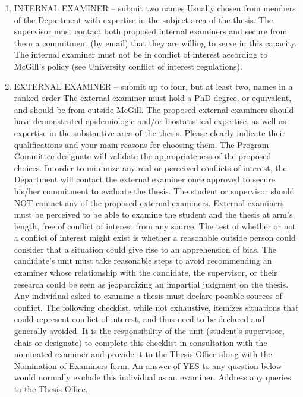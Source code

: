 \documentclass[
]{book}
\begin{document}
\begin{enumerate}
\def\labelenumi{\arabic{enumi}.}
\item
  INTERNAL EXAMINER -- submit two names
  Usually chosen from members of the Department with expertise in the subject area of the thesis. The supervisor must contact both proposed internal examiners and secure from them a commitment (by email) that they are willing to serve in this capacity. The internal examiner must not be in conflict of interest according to McGill's policy (see University conflict of interest regulations).
\item
  EXTERNAL EXAMINER -- submit up to four, but at least two, names in a ranked order
  The external examiner must hold a PhD degree, or equivalent, and should be from outside McGill. The proposed external examiners should have demonstrated epidemiologic and/or biostatistical expertise, as well as expertise in the substantive area of the thesis. Please clearly indicate their qualifications and your main reasons for choosing them. The Program Committee designate will validate the appropriateness of the proposed choices. In order to minimize any real or perceived conflicts of interest, the Department will contact the external examiner once approved to secure his/her commitment to evaluate the thesis. The student or supervisor should NOT contact any of the proposed external examiners.
  External examiners must be perceived to be able to examine the student and the thesis at arm's length, free of conflict of interest from any source. The test of whether or not a conflict of interest might exist is whether a reasonable outside person could consider that a situation could give rise to an apprehension of bias. The candidate's unit must take reasonable steps to avoid recommending an examiner whose relationship with the candidate, the supervisor, or their research could be seen as jeopardizing an impartial judgment on the thesis. Any individual asked to examine a thesis must declare possible sources of conflict. The following checklist, while not exhaustive, itemizes situations that could represent conflict of interest, and thus need to be declared and generally avoided. It is the responsibility of the unit (student's supervisor, chair or designate) to complete this checklist in consultation with the nominated examiner and provide it to the Thesis Office along with the Nomination of Examiners form. An answer of YES to any question below would normally exclude this individual as an examiner. Address any queries to the Thesis Office.\\
\end{enumerate}
\end{document}
